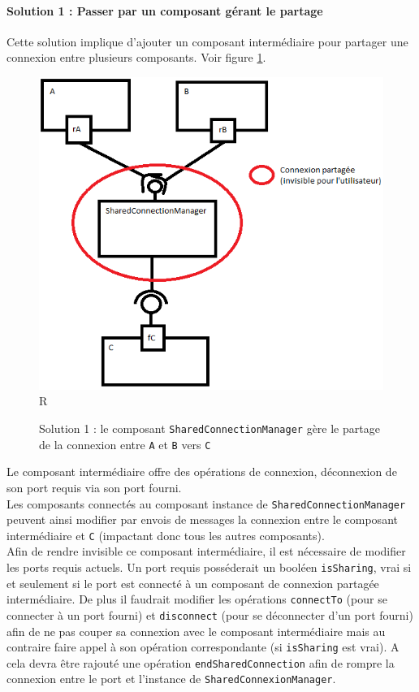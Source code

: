 \documentclass[11pt,a4paper,openany,oneside]{book}
\begin{document}
\paragraph{Solution 1 : Passer par un composant gérant le partage}
Cette solution implique d'ajouter un composant intermédiaire pour partager une connexion entre plusieurs composants. Voir figure \ref{solution1}.
\begin{figure}[H]
\centering
\includegraphics[scale=0.7, keepaspectratio=true]{solution1.png}R
\caption{Solution 1 : le composant \texttt{SharedConnectionManager} gère le partage de la connexion entre \texttt{A} et \texttt{B} vers \texttt{C}}
\label{solution1}
\end{figure}
Le composant intermédiaire offre des opérations de connexion, déconnexion de son port requis via son port fourni.\\
Les composants connectés au composant instance de \texttt{SharedConnectionManager} peuvent ainsi modifier par envois de messages la connexion entre le composant intermédiaire et \texttt{C} (impactant donc tous les autres composants).\\
Afin de rendre invisible ce composant intermédiaire, il est nécessaire de modifier les ports requis actuels. Un port requis posséderait un booléen \texttt{isSharing}, vrai si et seulement si le port est connecté à un composant de connexion partagée intermédiaire. De plus il faudrait modifier les opérations \texttt{connectTo} (pour se connecter à un port fourni) et \texttt{disconnect} (pour se déconnecter d'un port fourni) afin de ne pas couper sa connexion avec le composant intermédiaire mais au contraire faire appel à son opération correspondante (si \texttt{isSharing} est vrai). A cela devra être rajouté une opération \texttt{endSharedConnection} afin de rompre la connexion entre le port et l'instance de \texttt{SharedConnexionManager}.\\
\end{document}
